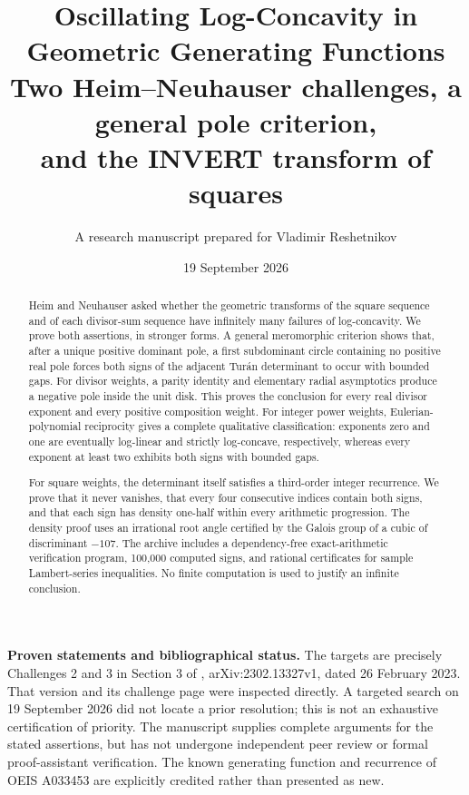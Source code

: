 \documentclass[11pt,letterpaper]{article}
\title{\vspace{-1.5em}\color{OliveInk}\textbf{Oscillating Log-Concavity in\\Geometric Generating Functions}\\[0.6em]
\large Two Heim--Neuhauser challenges, a general pole criterion,\\
and the INVERT transform of squares}
\author{\normalsize A research manuscript prepared for Vladimir Reshetnikov}
\date{19 September 2026}
\theoremstyle{definition}
\numberwithin{equation}{section}
\begin{document}
\maketitle
\thispagestyle{empty}

\begin{abstract}
Heim and Neuhauser asked whether the geometric transforms of the square
sequence and of each divisor-sum sequence have infinitely many failures of
log-concavity. We prove both assertions, in stronger forms. A general
meromorphic criterion shows that, after a unique positive dominant pole,
a first subdominant circle containing no positive real pole forces both
signs of the adjacent Tur\'an determinant to occur with bounded gaps.
For divisor weights, a parity identity and elementary radial asymptotics
produce a negative pole inside the unit disk. This proves the conclusion
for every real divisor exponent and every positive composition weight.
For integer power weights, Eulerian-polynomial reciprocity gives a complete
qualitative classification: exponents zero and one are eventually
log-linear and strictly log-concave, respectively, whereas every exponent
at least two exhibits both signs with bounded gaps.

For square weights, the determinant itself satisfies a third-order integer
recurrence. We prove that it never vanishes, that every four consecutive
indices contain both signs, and that each sign has density one-half within
every arithmetic progression. The density proof uses an irrational root
angle certified by the Galois group of a cubic of discriminant $-107$.
The archive includes a dependency-free exact-arithmetic verification program,
100,000 computed signs, and rational certificates for sample Lambert-series
inequalities. No finite computation is used to justify an infinite conclusion.
\end{abstract}

\begin{summarybox}
\textbf{Proven statements and bibliographical status.}
The targets are precisely Challenges 2 and 3 in Section 3 of
\cite{HN23}, arXiv:2302.13327v1, dated 26 February 2023.
That version and its challenge page were inspected directly. A targeted
search on 19 September 2026 did not locate a prior resolution; this is not
an exhaustive certification of priority. The manuscript supplies complete
arguments for the stated assertions, but has not undergone independent
peer review or formal proof-assistant verification. The known generating
function and recurrence of OEIS A033453 are explicitly credited rather
than presented as new.
\end{summarybox}
\end{document}
